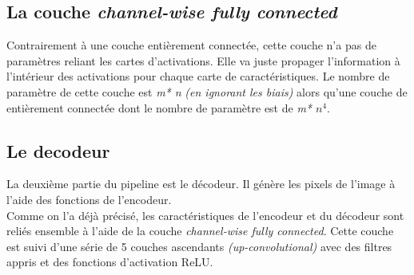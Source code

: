 \documentclass[11pt,a4paper]{article}
\begin{document}
        \subsection{La couche \emph{channel-wise fully connected}}
            Contrairement à une couche entièrement connectée, cette couche n’a pas de paramètres reliant les cartes d’activations. Elle va juste propager l’information à l’intérieur des activations pour chaque carte de caractéristiques.  Le nombre de paramètre de cette couche est \emph{m* n} \emph{(en ignorant les biais)} alors qu'une couche de entièrement connectée dont le nombre de paramètre est de \emph{m* $n^{\text{4}}$}.

        \subsection{Le decodeur}
            La deuxième partie du pipeline est le décodeur. Il génère les pixels de l’image à l’aide des fonctions de l’encodeur.\\
            Comme on l’a déjà précisé, les caractéristiques de l’encodeur et du décodeur sont reliés ensemble à l’aide de la couche \emph{channel-wise fully connected}. Cette couche est suivi d’une série de 5 couches ascendants \emph{(up-convolutional)} avec des filtres appris et des fonctions d’activation ReLU. 
            
\end{document}
